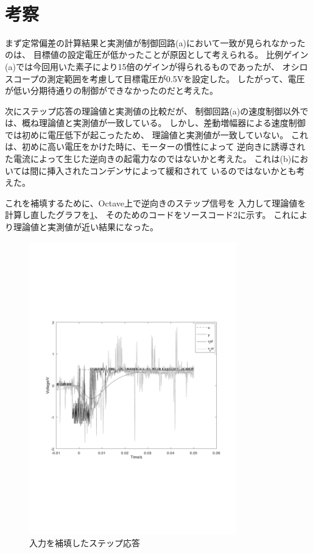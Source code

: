 \documentclass[uplatex, 11pt,a4j, titlepage]{jsarticle}
\begin{document}
\newpage
\ 
\newpage
\ 
\newpage
\ 
\newpage
\ 
\newpage

\section{考察}

まず定常偏差の計算結果と実測値が制御回路(a)において一致が見られなかったのは、
目標値の設定電圧が低かったことが原因として考えられる。
比例ゲイン(a)では今回用いた素子により15倍のゲインが得られるものであったが、
オシロスコープの測定範囲を考慮して目標電圧が0.5Vを設定した。
したがって、電圧が低い分期待通りの制御ができなかったのだと考えた。

次にステップ応答の理論値と実測値の比較だが、
制御回路(a)の速度制御以外では、概ね理論値と実測値が一致している。
しかし、差動増幅器による速度制御では初めに電圧低下が起こったため、
理論値と実測値が一致していない。
これは、初めに高い電圧をかけた時に、モーターの慣性によって
逆向きに誘導された電流によって生じた逆向きの起電力なのではないかと考えた。
これは(b)においては間に挿入されたコンデンサによって緩和されて
いるのではないかとも考えた。

これを補填するために、Octave上で逆向きのステップ信号を
入力して理論値を計算し直したグラフを\ref{riron_new}、
そのためのコードをソースコード2に示す。
これにより理論値と実測値が近い結果になった。

\begin{figure}[h]
    \centering
    \includegraphics[width=9cm]{riron_new.pdf}
    \caption{入力を補填したステップ応答}
    \label{riron_new}
\end{figure}
\end{document}
